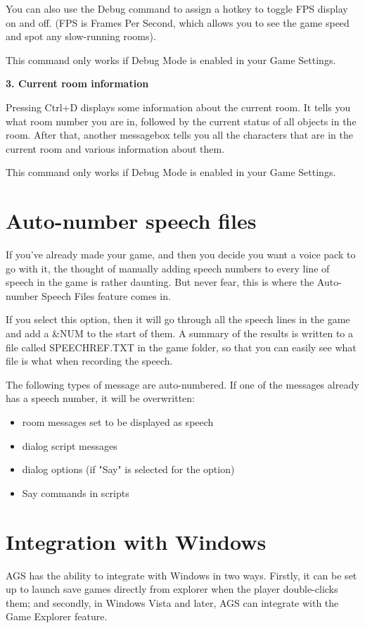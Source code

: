 You can also use the Debug command to assign a hotkey to toggle FPS display on and off.
(FPS is Frames Per Second, which allows you to see the game speed and spot any slow-running
rooms).

This command only works if Debug Mode is enabled in your Game Settings.

\bf{3. Current room information}

Pressing Ctrl+D displays some information about the current room. It tells you what
room number you are in, followed by the current status of all objects in the room. After that,
another messagebox tells you all the characters that are in the current room and various
information about them.

This command only works if Debug Mode is enabled in your Game Settings.


\section{Auto-number speech files}%

If you've already made your game, and then you decide you want a voice pack to go with it,
the thought of manually adding speech numbers to every line of speech in the game is rather
daunting. But never fear, this is where the Auto-number Speech Files feature comes in.

If you select this option, then it will go through all the speech lines in the game and
add a &NUM to the start of them. A summary of the results is written to a file called
SPEECHREF.TXT in the game folder, so that you can easily see what file is what when
recording the speech.

The following types of message are auto-numbered. If one of the messages already has a speech
number, it will be overwritten:
\begin{itemize}
\item room messages set to be displayed as speech
\item dialog script messages
\item dialog options (if "Say" is selected for the option)
\item Say commands in scripts
\end{itemize}


\section{Integration with Windows}%

AGS has the ability to integrate with Windows in two ways. Firstly, it can
be set up to launch save games directly from explorer when the player double-clicks
them; and secondly, in Windows Vista and later, AGS can integrate with the Game Explorer feature.


